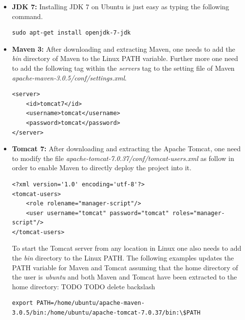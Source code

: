 \begin{itemize}
\item{\textbf{\ac{JDK} 7:}} Installing  \ac{JDK} 7 on Ubuntu is just easy as typing the following command.%
\begin{code}
\begin{verbatim}
sudo apt-get install openjdk-7-jdk
\end{verbatim}
\end{code}

\item{\textbf{Maven 3:}}  After downloading and extracting Maven, one needs to add the \textit{bin} directory of Maven to the Linux PATH variable. Further more one need to add the following tag within the \textit{servers} tag to the setting file of Maven \textit{apache-maven-3.0.5/conf/settings.xml}.
\begin{code}
\begin{verbatim}
<server>
	<id>tomcat7</id>
	<username>tomcat</username>
	<password>tomcat</password>
</server>
\end{verbatim}
\end{code}

\item{\textbf{Tomcat 7:}} After downloading and extracting the Apache Tomcat, one need to modify the file \textit{apache-tomcat-7.0.37/conf/tomcat-users.xml} as follow in order to enable Maven to directly deploy the project into it. 
\begin{code}
\begin{verbatim}
<?xml version='1.0' encoding='utf-8'?>
<tomcat-users>
	<role rolename="manager-script"/>
	<user username="tomcat" password="tomcat" roles="manager-script"/>
</tomcat-users>
\end{verbatim}
\end{code}

To start the Tomcat server from any location in Linux one also needs to add the \textit{bin} directory to the Linux PATH. The following examples updates the PATH variable for Maven and Tomcat assuming that the home directory of the user is \textit{ubuntu} and both Maven and Tomcat have been extracted to the home directory:
TODO TODO delete backslash
\begin{code}
\begin{verbatim}
export PATH=/home/ubuntu/apache-maven-3.0.5/bin:/home/ubuntu/apache-tomcat-7.0.37/bin:\$PATH
\end{verbatim}
\end{code}


\end{itemize}
